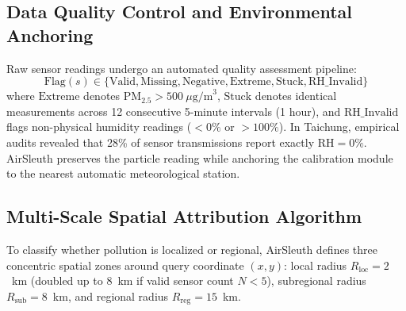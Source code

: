 \documentclass[conference]{IEEEtran}
\begin{document}
\subsection{Data Quality Control and Environmental Anchoring}
Raw sensor readings undergo an automated quality assessment pipeline:
\begin{equation}
\text{Flag}(s) \in \{\text{Valid}, \text{Missing}, \text{Negative}, \text{Extreme}, \text{Stuck}, \text{RH\_Invalid}\}
\end{equation}
where $\text{Extreme}$ denotes $\text{PM}_{2.5} > 500~\mu\text{g/m}^3$, $\text{Stuck}$ denotes identical measurements across 12 consecutive 5-minute intervals (1 hour), and $\text{RH\_Invalid}$ flags non-physical humidity readings ($<0\%$ or $>100\%$). In Taichung, empirical audits revealed that 28\% of sensor transmissions report exactly $\text{RH} = 0\%$. AirSleuth preserves the particle reading while anchoring the calibration module to the nearest automatic meteorological station.

\subsection{Multi-Scale Spatial Attribution Algorithm}
To classify whether pollution is localized or regional, AirSleuth defines three concentric spatial zones around query coordinate $(x, y)$: local radius $R_{\text{loc}} = 2$~km (doubled up to 8~km if valid sensor count $N < 5$), subregional radius $R_{\text{sub}} = 8$~km, and regional radius $R_{\text{reg}} = 15$~km. 
\end{document}

